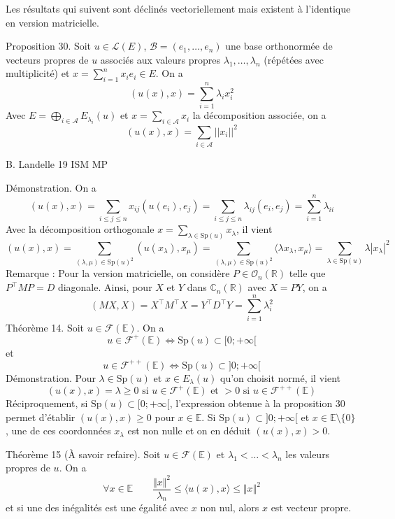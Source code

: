 Les résultats qui suivent sont déclinés vectoriellement mais existent à l'identique en version matricielle.

Proposition 30. Soit $u \in \mathcal{L}(E)$, $\mathcal{B} = (e_1, \dots, e_n)$ une base orthonormée de vecteurs propres de $u$ associés aux valeurs propres $\lambda_1, \dots, \lambda_n$ (répétées avec multiplicité) et $x = \sum_{i=1}^n x_i e_i \in E$. On a
\[
(u(x),x) = \sum_{i=1}^n \lambda_i x_i^2
\]
Avec $E = \bigoplus_{i \in \mathcal{A}} E_{\lambda_i}(u)$ et $x = \sum_{i \in \mathcal{A}} x_i$ la décomposition associée, on a
\[
(u(x),x) = \sum_{i \in \mathcal{A}} ||x_i||^2
\]

B. Landelle
\hspace{1cm}
19
\hspace{1cm}
ISM MP


Démonstration. On a
\[
(u(x), x) = \sum_{i \leq j \leq n} x_{ij} (u(e_i), e_j) = \sum_{i \leq j \leq n} \lambda_{ij} (e_i, e_j) = \sum_{i=1}^n \lambda_{ii}
\]
Avec la décomposition orthogonale $x = \sum_{\lambda \in \text{Sp}(u)} x_\lambda$, il vient
\[
(u(x), x) = \sum_{(\lambda, \mu) \in \text{Sp}(u)^2} (u(x_\lambda), x_\mu) = \sum_{(\lambda, \mu) \in \text{Sp}(u)^2} \langle \lambda x_\lambda, x_\mu \rangle = \sum_{\lambda \in \text{Sp}(u)} \lambda |x_\lambda|^2
\]
Remarque : Pour la version matricielle, on considère $P \in \mathcal{O}_n(\mathbb{R})$ telle que $P^\top MP = D$ diagonale. Ainsi, pour $X$ et $Y$ dans $\mathbb{C}_n(\mathbb{R})$ avec $X = PY$, on a
\[
(MX, X) = X^\top M^\top X = Y^\top D^\top Y = \sum_{i=1}^n \lambda_i^2
\]
Théorème 14. Soit $u \in \mathcal{F}(\mathbb{E})$. On a
\[
u \in \mathcal{F}^+(\mathbb{E}) \Leftrightarrow \text{Sp}(u) \subset [0; +\infty[
\]
et
\[
u \in \mathcal{F}^{++}(\mathbb{E}) \Leftrightarrow \text{Sp}(u) \subset ]0; +\infty[
\]
Démonstration. Pour $\lambda \in \text{Sp}(u)$ et $x \in E_\lambda(u)$ qu'on choisit normé, il vient
\[
(u(x), x) = \lambda \geq 0 \text{ si } u \in \mathcal{F}^+(\mathbb{E}) \text{ et } > 0 \text{ si } u \in \mathcal{F}^{++}(\mathbb{E})
\]
Réciproquement, si $\text{Sp}(u) \subset [0; +\infty[$, l'expression obtenue à la proposition 30 permet d'établir $(u(x), x) \geq 0$ pour $x \in \mathbb{E}$. Si $\text{Sp}(u) \subset ]0; +\infty[$ et $x \in \mathbb{E} \setminus \{0\}$, une de ces coordonnées $x_\lambda$ est non nulle et on en déduit $(u(x), x) > 0$.

Théorème 15 (À savoir refaire). Soit $u \in \mathcal{F}(\mathbb{E})$ et $\lambda_1 < \dots < \lambda_n$ les valeurs propres de $u$. On a
\[
\forall x \in \mathbb{E} \qquad \frac{\Vert x \Vert^2}{\lambda_n} \leq \langle u(x), x \rangle \leq \Vert x \Vert^2
\]
et si une des inégalités est une égalité avec $x$ non nul, alors $x$ est vecteur propre.

